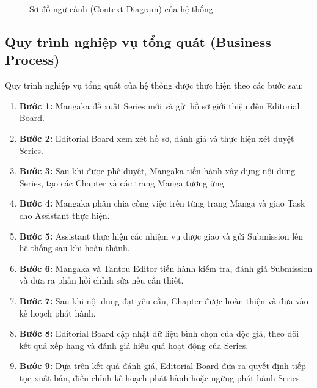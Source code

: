 \begin{figure}[H]
    \caption{Sơ đồ ngữ cảnh (Context Diagram) của hệ thống}
    \label{fig:context_diagram}
\end{figure}

\subsection{Quy trình nghiệp vụ tổng quát (Business Process)}
\label{subsec:srs_business_process}
Quy trình nghiệp vụ tổng quát của hệ thống được thực hiện theo các bước sau:
\begin{enumerate}
    \item \textbf{Bước 1:} Mangaka đề xuất Series mới và gửi hồ sơ giới thiệu đến Editorial Board.
    \item \textbf{Bước 2:} Editorial Board xem xét hồ sơ, đánh giá và thực hiện xét duyệt Series.
    \item \textbf{Bước 3:} Sau khi được phê duyệt, Mangaka tiến hành xây dựng nội dung Series, tạo các Chapter và các trang Manga tương ứng.
    \item \textbf{Bước 4:} Mangaka phân chia công việc trên từng trang Manga và giao Task cho Assistant thực hiện.
    \item \textbf{Bước 5:} Assistant thực hiện các nhiệm vụ được giao và gửi Submission lên hệ thống sau khi hoàn thành.
    \item \textbf{Bước 6:} Mangaka và Tantou Editor tiến hành kiểm tra, đánh giá Submission và đưa ra phản hồi chỉnh sửa nếu cần thiết.
    \item \textbf{Bước 7:} Sau khi nội dung đạt yêu cầu, Chapter được hoàn thiện và đưa vào kế hoạch phát hành.
    \item \textbf{Bước 8:} Editorial Board cập nhật dữ liệu bình chọn của độc giả, theo dõi kết quả xếp hạng và đánh giá hiệu quả hoạt động của Series.
    \item \textbf{Bước 9:} Dựa trên kết quả đánh giá, Editorial Board đưa ra quyết định tiếp tục xuất bản, điều chỉnh kế hoạch phát hành hoặc ngừng phát hành Series.
\end{enumerate}

